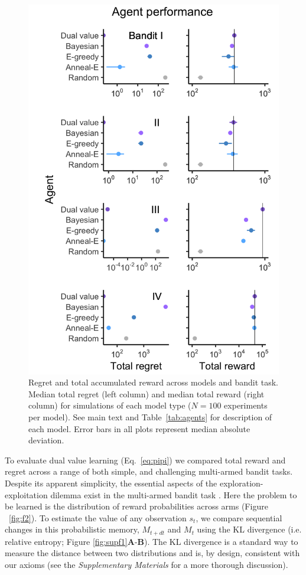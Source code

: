 \documentclass[fleqn,10pt]{wlscirep}
\begin{document}
\begin{figure}
	[tbhp] \centering 
	\includegraphics[width=.5\linewidth]{figures/fig3.png} 
	\caption{ \label{fig:f3} Regret and total accumulated reward across models and bandit task. Median total regret (left column) and median total reward (right column) for simulations of each model type ($N=100$ experiments per model). See main text and Table~\ref{tab:agents} for description of each model. Error bars in all plots represent median absolute deviation.} 
\end{figure}

To evaluate dual value learning (Eq.~\ref{eq:pipi}) we compared total reward and regret across a range of both simple, and challenging multi-armed bandit tasks. Despite its apparent simplicity, the essential aspects of the exploration-exploitation dilemma exist in the multi-armed bandit task \cite{Sutton2018}. Here the problem to be learned is the distribution of reward probabilities across arms (Figure ~\ref{fig:f2}).  To estimate the value of any observation $s_t$, we compare sequential changes in this probabilistic memory, $M_{t+dt}$ and $M_t$ using the KL divergence (i.e. relative entropy; Figure \ref{fig:supf1}\textbf{A}-\textbf{B}). The KL divergence is a standard way to measure the distance between two distributions \cite{MacKay2003} and is, by design, consistent with our axioms (see the \textit{Supplementary Materials} for a more thorough discussion). 
\end{document}
